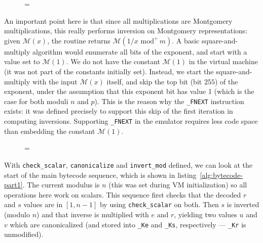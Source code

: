 \documentclass{llncs}
\newenvironment{forbidpagebreak}
    {\par\nobreak\vfil\penalty 0\vfilneg
     \vtop\bgroup}
    {\par\xdef\tpd{\the\prevdepth}\egroup
     \prevdepth=\tpd}
\newcommand{\umod}[2]{#1 \,\,\text{mod}^{+}\, #2}
\newcommand{\mont}[1]{\mathcal{M}(#1)}
\begin{document}
\begin{figure}
\begin{forbidpagebreak}

\end{forbidpagebreak}
\end{figure}

An important point here is that since all multiplications are Montgomery
multiplications, this really performs inversion on Montgomery
representations: given $\mont{x}$, the routine returns
$\mont{\umod{1/x}{m}}$. A basic square-and-multiply algorithm would
enumerate all bits of the exponent, and start with a value set to
$\mont{1}$. We do not have the constant $\mont{1}$ in the virtual
machine (it was not part of the constants initially set). Instead, we
start the square-and-multiply with the input $\mont{x}$ itself, and skip
the top bit (bit $255$) of the exponent, under the assumption that this
exponent bit has value 1 (which is the case for both moduli $n$ and
$p$). This is the reason why the \verb+_FNEXT+ instruction exists: it
was defined precisely to support this skip of the first iteration in
computing inversions. Supporting \verb+_FNEXT+ in the emulator requires
less code space than embedding the constant $\mont{1}$.

\begin{figure}
\begin{forbidpagebreak}

\end{forbidpagebreak}
\end{figure}

With \verb+check_scalar+, \verb+canonicalize+ and \verb+invert_mod+
defined, we can look at the start of the main bytecode sequence, which
is shown in listing~\ref{alg:bytecode-part1}. The current modulus is $n$
(this was set during VM initialization) so all operations here work
on scalars. This sequence first checks that the decoded $r$ and $s$
values are in $[1, n-1]$ by using \verb+check_scalar+ on both. Then $s$
is inverted (modulo $n$) and that inverse is multiplied with $e$ and
$r$, yielding two values $u$ and $v$ which are canonicalized (and stored
into \verb+_Ke+ and \verb+_Ks+, respectively --- \verb+_Kr+ is
unmodified).
\end{document}
